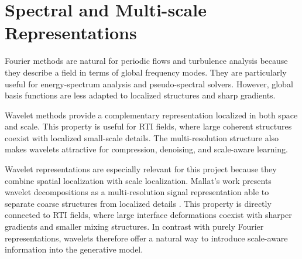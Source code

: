 \section{Spectral and Multi-scale Representations}

Fourier methods are natural for periodic flows and turbulence analysis because they describe a field in terms of global frequency modes. They are particularly useful for energy-spectrum analysis and pseudo-spectral solvers. However, global basis functions are less adapted to localized structures and sharp gradients.

Wavelet methods provide a complementary representation localized in both space and scale. This property is useful for RTI fields, where large coherent structures coexist with localized small-scale details. The multi-resolution structure also makes wavelets attractive for compression, denoising, and scale-aware learning.

Wavelet representations are especially relevant for this project because they
combine spatial localization with scale localization. Mallat's work presents
wavelet decompositions as a multi-resolution signal representation able to
separate coarse structures from localized details \citep{Mallat2009}. This
property is directly connected to RTI fields, where large interface
deformations coexist with sharper gradients and smaller mixing structures. In
contrast with purely Fourier representations, wavelets therefore offer a
natural way to introduce scale-aware information into the generative model.

